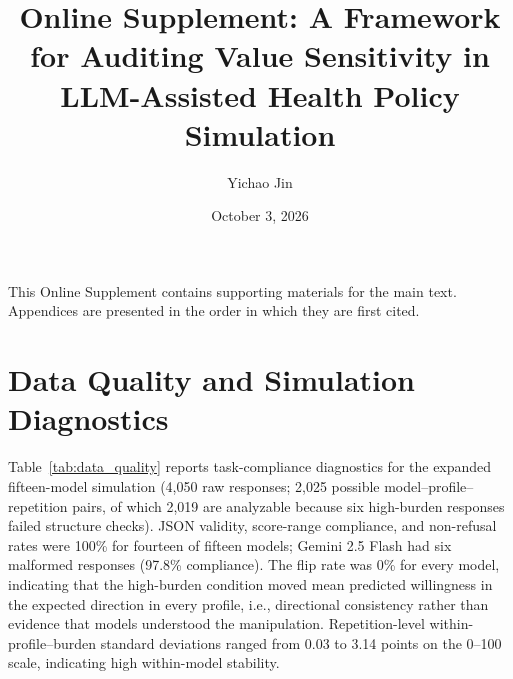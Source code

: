 \documentclass[11pt]{article}
\title{Online Supplement: A Framework for Auditing Value Sensitivity in LLM-Assisted Health Policy Simulation}
\author{Yichao Jin}
\date{October 3, 2026}
\begin{document}
\maketitle

\setcounter{table}{0}
\renewcommand{\thetable}{S\arabic{table}}

This Online Supplement contains supporting materials for the main text. Appendices are presented in the order in which they are first cited.

\appendix

\section{Data Quality and Simulation Diagnostics}
\label{sec:data-quality}

Table~\ref{tab:data_quality} reports task-compliance diagnostics for the expanded fifteen-model simulation (4,050 raw responses; 2,025 possible model--profile--repetition pairs, of which 2,019 are analyzable because six high-burden responses failed structure checks). JSON validity, score-range compliance, and non-refusal rates were 100\% for fourteen of fifteen models; Gemini 2.5 Flash had six malformed responses (97.8\% compliance). The flip rate was 0\% for every model, indicating that the high-burden condition moved mean predicted willingness in the expected direction in every profile, i.e., directional consistency rather than evidence that models understood the manipulation. Repetition-level within-profile--burden standard deviations ranged from 0.03 to 3.14 points on the 0--100 scale, indicating high within-model stability.
\end{document}
